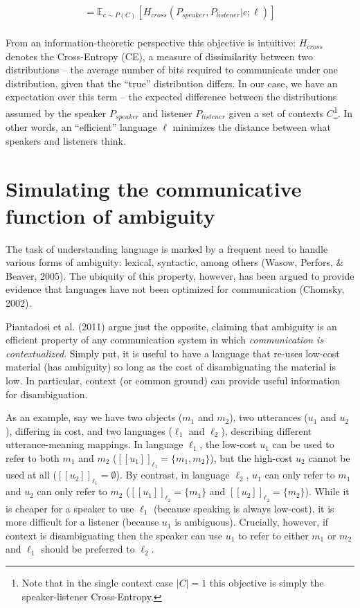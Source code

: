 \documentclass[10pt, letterpaper]{article}
\begin{document}
\begin{equation}
\begin{split}
  = \mathbb{E}_{c \sim P(C)}[H_{cross}(P_{speaker}, P_{listener} | c; \ell)]\\
\end{split}
\end{equation}

From an information-theoretic perspective this objective is intuitive:
\(H_{cross}\) denotes the Cross-Entropy (CE), a measure of dissimilarity
between two distributions -- the average number of bits required to
communicate under one distribution, given that the ``true'' distribution
differs. In our case, we have an expectation over this term -- the
expected difference between the distributions assumed by the speaker
\(P_{speaker}\) and listener \(P_{listener}\) given a set of contexts
\(C\)\footnote{Note that in the single context case $|C|=1$ this objective is simply the speaker-listener Cross-Entropy.}.
In other words, an ``efficient'' language \(\ell\) minimizes the
distance between what speakers and listeners think.

\section{Simulating the communicative function of
ambiguity}\label{simulating-the-communicative-function-of-ambiguity}

The task of understanding language is marked by a frequent need to
handle various forms of ambiguity: lexical, syntactic, among others
(Wasow, Perfors, \& Beaver, 2005). The ubiquity of this property,
however, has been argued to provide evidence that languages have not
been optimized for communication (Chomsky, 2002).

Piantadosi et al. (2011) argue just the opposite, claiming that
ambiguity is an efficient property of any communication system in which
\emph{communication is contextualized}. Simply put, it is useful to have
a language that re-uses low-cost material (has ambiguity) so long as the
cost of disambiguating the material is low. In particular, context (or
common ground) can provide useful information for disambiguation.\par

As an example, say we have two objects (\(m_1\) and \(m_2\)), two
utterances (\(u_1\) and \(u_2\)), differing in cost, and two languages
(\(\ell_1\) and \(\ell_2\)), describing different utterance-meaning
mappings. In language \(\ell_1\), the low-cost \(u_1\) can be used to
refer to both \(m_1\) and \(m_2\)
(\([[u_1]]_{\ell_1} = \{m_1, m_2 \}\)), but the high-cost \(u_2\) cannot
be used at all (\([[u_2]]_{\ell_1} = \emptyset\)). By contrast, in
language \(\ell_2\), \(u_1\) can only refer to \(m_1\) and \(u_2\) can
only refer to \(m_2\) (\([[u_1]]_{\ell_2} = \{m_1\}\) and
\([[u_2]]_{\ell_2} = \{m_2 \}\)). While it is cheaper for a speaker to
use \(\ell_1\) (because speaking is always low-cost), it is more
difficult for a listener (because \(u_1\) is ambiguous). Crucially,
however, if context is disambiguating then the speaker can use \(u_1\)
to refer to either \(m_1\) or \(m_2\) and \(\ell_1\) should be preferred
to \(\ell_2\).\par
\end{document}
